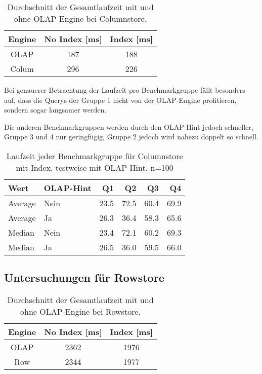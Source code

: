 \setlength\intextsep{0pt}
\begin{wraptable}{r}{0.5\textwidth}
    \begin{tabular}{ccc}
        \toprule
        Engine              & No Index [ms]   & Index [ms] \\
        \toprule
        OLAP                & 187        & 188            \\
        Colum               & 296        & 226            \\   
        \bottomrule
    \end{tabular}
	\caption{Durchschnitt der Gesamtlaufzeit mit und ohne OLAP-Engine bei Columnstore.}
    \label{tab:olap}
\end{wraptable}

Bei genauerer Betrachtung der Laufzeit pro Benchmarkgruppe fällt besonders auf, dass die Querys der Gruppe 1 nicht von der OLAP-Engine profitieren, sondern sogar langsamer werden. 

Die anderen Benchmarkgruppen werden durch den OLAP-Hint jedoch schneller, Gruppe 3 und 4 nur geringfügig, Gruppe 2 jedoch wird nahezu doppelt so schnell.
\begin{table}[H]
    \centering
    \begin{tabularx}{\textwidth}{lXrrrr}
    \toprule
	Wert        &	OLAP-Hint & Q1 	    &	Q2 	    &	Q3	    &	Q4 \\
    \toprule
    Average	    & Nein        &	23.5	&	72.5	&	60.4	&	69.9 \\
    Average     & Ja	      &	26.3	&	36.4	&	58.3	&	65.6 \\
    \midrule
    Median	    & Nein        &	23.4	&	72.1	&	60.2	&	69.3 \\
    Median	    & Ja          &	26.5	&	36.0	&	59.5	&	66.0 \\
    \bottomrule
    \end{tabularx}
	\caption{Laufzeit jeder Benchmarkgruppe für Columnstore mit Index, testweise mit OLAP-Hint. n=100}
    \label{tab:olap_bench}
\end{table}
\setlength\intextsep{0pt}
\subsection{Untersuchungen für Rowstore}
\begin{wraptable}{r}{0.5\textwidth}
    \begin{tabular}{ccc}
        \toprule
        Engine              & No Index [ms]   & Index [ms] \\
        \toprule
        OLAP                & 2362        & 1976           \\
        Row                 & 2344        & 1977           \\   
        \bottomrule
    \end{tabular}
	\caption{Durchschnitt der Gesamtlaufzeit mit und ohne OLAP-Engine bei Rowstore.}
    \label{tab:olap}
\end{wraptable}

